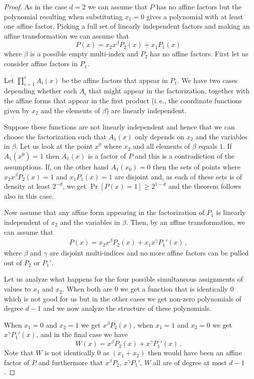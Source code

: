\begin{proof}
As in the case $d=2$ we can assume that $P$
has no affine factors but the polynomial resulting
when substituting $x_1=0$ gives a polynomial
with at least one affine factor.  Picking
a full set of linearly independent factors
and making an affine transformation we can
assume that
$$
P(x)=x_2 x^\beta P_2(x)+ x_1 P_1(x)$$
where $\beta$ is a  possible empty multi-index and
$P_2$ has no affine factors. First
let us consider affine factors in $P_1$.  

Let $\prod_{i=1}^r A_i(x)$ be the affine
factors that appear in $P_1$.  We have two
cases depending whether each $A_i$ that might appear
in the factorization, together with the
affine forms that appear in the first product
(i.\,e., the coordinate functions given by $x_2$
and the elements of $\beta$) are linearly independent.

Suppose these functions are not linearly independent and hence that
we can choose the factorization such
that $A_1(x)$ only depends
on $x_2$ and the variables in $\beta$.  Let
us look at the point $x^0$ where $x_2$ and all
elements of $\beta$ equals $1$.  If $A_1(x^0)=1$
then $A_1(x)$ is a factor of $P$
and this is a contradiction of the assumptions.
If, on the other hand $A_1(x_0)=0$ then the sets of points
where $x_2 x^\beta P_2(x)=1$ and $x_1 P_1(x)=1$
are disjoint and, as each of these sets is of density
at least $2^{-d}$,  we get $\Pr[P(x)=1] \geq 2^{1-d}$ and the
theorem follows also in this case.

Now assume that any affine form  appearing in the factorization
of $P_1$ is linearly independent of $x_2$ and the variables
in $\beta$.  Then, by an affine transformation,
we can assume that 
\begin{eqnarray}
P(x)=x_2 x^\beta P_2(x)+ x_1 x^\gamma P_1'(x)\,,
\end{eqnarray}
where $\beta$ and $\gamma$ are disjoint
multi-indices and no more affine factors
can be pulled out of $P_2$ or $P_1'$.

Let us analyze what happens for
the four possible simultaneous assignments
of values to $x_1$ and $x_2$.
When both are 0 we get a function that is
identically 0 which is not good for us
but in the other cases we get non-zero polynomials
of degree $d-1$ and we now analyze the 
structure of these polynomials.

When $x_1=0$ and $x_2=1$
we get $x^\beta P_2(x)$, when
$x_1=1$ and $x_2=0$ we get
$x^\gamma P_1'(x)$, and in the final
case we have
$$
W(x)=x^\beta P_2(x)+ x^\gamma P_1'(x)\,.$$
Note that $W$ is not identically 0
as $(x_1+x_2)$ then would have been
an affine factor of $P$ and furthermore that
$x^{\beta}P_2$, $x^{\gamma}P_1'$, $W$ all are of degree at
most $d-1$.


\end{proof}
